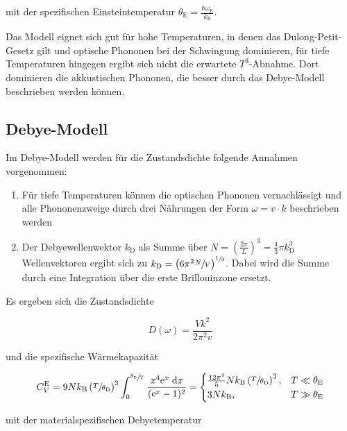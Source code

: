 mit der spezifischen Einsteintemperatur $\theta_\text{E} = \frac{\hbar\omega_\text{E}}{k_\text{B}}$.

Das Modell eignet sich gut für hohe Temperaturen, in denen das Dulong-Petit-Gesetz gilt und optische Phononen bei der Schwingung
dominieren, für tiefe Temperaturen hingegen ergibt sich nicht die erwartete $T^3$-Abnahme. Dort dominieren die akkustischen
Phononen, die besser durch das Debye-Modell beschrieben werden können.

\subsection{Debye-Modell}

Im Debye-Modell werden für die Zustandsdichte folgende Annahmen vorgenommen:

\begin{enumerate}
    \item Für tiefe Temperaturen können die optischen Phononen vernachlässigt und alle Phononenzweige durch drei Nährungen der Form $\omega = v \cdot k$ beschrieben werden
    \item Der Debyewellenwektor $k_\text{D}$ als Summe über $N = \left(\frac{2\pi}{L}\right)^3   = \frac{4}{3} \pi k_\text{D}^3$ Wellenvektoren ergibt sich zu $k_\text{D} = \left(6\pi^2\sfrac{N}{V}\right)^{\sfrac{1}{3}}$. Dabei wird die Summe durch eine Integration über die erste Brillouinzone ersetzt.
\end{enumerate}

Es ergeben sich die Zustandsdichte 

\begin{equation}
    D(\omega) = \frac{Vk^2}{2\pi^2v}
\end{equation}

und die spezifische Wärmekapazität

\begin{equation}
    C_V^\text{E} = 9Nk_\text{B} \left(\sfrac{T}{\theta_\text{D}}\right)^3 \int_0^{\sfrac{\theta_\text{D}}{T}} 
    \frac{x^4\text{e}^x \; \text{d}x}{(\text{e}^x - 1)^2} = 
    \begin{cases}
        \frac{12\pi^4}{5}Nk_\text{B}\left(\sfrac{T}{\theta_\text{D}}\right)^3, & T \ll \theta_\text{E} \\
        3Nk_\text{B} , & T \gg \theta_\text{E}
    \end{cases}
\end{equation}

mit der materialspezifischen Debyetemperatur 

